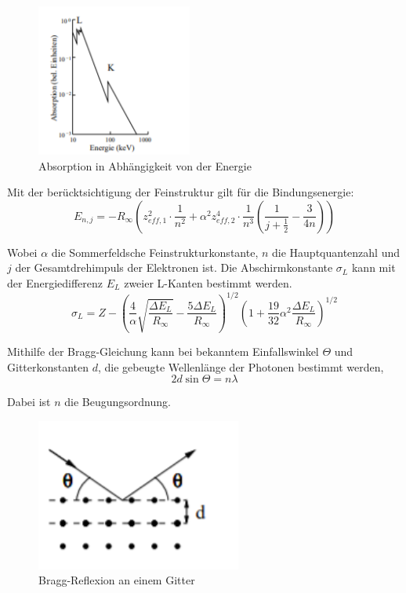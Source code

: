 \begin{figure}[H]
  \centering
  \includegraphics[height=5cm]{kante.PNG}
  \caption{Absorption in Abhängigkeit von der Energie}
  \label{fig:kathode}
\end{figure}

Mit der berücktsichtigung der Feinstruktur gilt für die Bindungsenergie:
\begin{equation}
E_{n,j} = -R_{\infty} \left( z_{eff,1}^2 \cdot \frac{1}{n^2} + \alpha^2 z_{eff,2}^4 \cdot \frac{1}{n^3}
\left(\frac{1}{j+ \frac{1}{2}} - \frac{3}{4n} \right) \right)
\end{equation}

Wobei $\alpha$ die Sommerfeldsche Feinstrukturkonstante, $n$ die Hauptquantenzahl und $j$ der Gesamtdrehimpuls der
Elektronen ist.
Die Abschirmkonstante $\sigma_L$ kann mit der Energiedifferenz $E_L$ zweier L-Kanten bestimmt werden.
\begin{equation}
  \sigma_L = Z -\left(\frac{4}{\alpha} \sqrt{\frac{\Delta E_L}{R_{\infty}}} - \frac{5 \Delta E_L}{R_{\infty}} \right)^{1/2}
  \left(1 + \frac{19}{32} \alpha^2  \frac{\Delta E_L}{R_{\infty}} \right)^{1/2}
\end{equation}


Mithilfe der Bragg-Gleichung kann bei bekanntem Einfallswinkel $\Theta$ und Gitterkonstanten $d$, die gebeugte Wellenlänge
der Photonen bestimmt werden,
\begin{equation}
  2d \sin{\Theta} = n \lambda
\end{equation}

Dabei ist $n$ die Beugungsordnung.

\begin{figure}[H]
  \centering
  \includegraphics[height=5cm]{bragg.PNG}
  \caption{Bragg-Reflexion an einem Gitter}
  \label{fig:kathode}
\end{figure}

